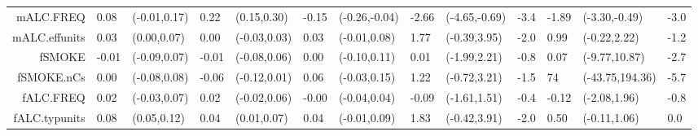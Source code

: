 {\begin{tabular}{rLlLlLlLlLLlL}
  mALC.FREQ & 0.08 & (-0.01,0.17) & 0.22 & (0.15,0.30) & -0.15 & (-0.26,-0.04) & -2.66 & (-4.65,-0.69) & -3.4 & -1.89 & (-3.30,-0.49) & -3.0 \\ 
  mALC.effunits & 0.03 & (0.00,0.07) & 0.00 & (-0.03,0.03) & 0.03 & (-0.01,0.08) & 1.77 & (-0.39,3.95) & -2.0 & 0.99 & (-0.22,2.22) & -1.2 \\ 
  fSMOKE & -0.01 & (-0.09,0.07) & -0.01 & (-0.08,0.06) & 0.00 & (-0.10,0.11) & 0.01 & (-1.99,2.21) & -0.8 & 0.07 & (-9.77,10.87) & -2.7 \\ 
  fSMOKE.nCs & 0.00 & (-0.08,0.08) & -0.06 & (-0.12,0.01) & 0.06 & (-0.03,0.15) & 1.22 & (-0.72,3.21) & -1.5 & 74 & (-43.75,194.36) & -5.7 \\ 
  fALC.FREQ & 0.02 & (-0.03,0.07) & 0.02 & (-0.02,0.06) & -0.00 & (-0.04,0.04) & -0.09 & (-1.61,1.51) & -0.4 & -0.12 & (-2.08,1.96) & -0.8 \\ 
  fALC.typunits & 0.08 & (0.05,0.12) & 0.04 & (0.01,0.07) & 0.04 & (-0.01,0.09) & 1.83 & (-0.42,3.91) & -2.0 & 0.50 & (-0.11,1.06) & 0.0 \\ 
   \hline
\end{tabular}}
